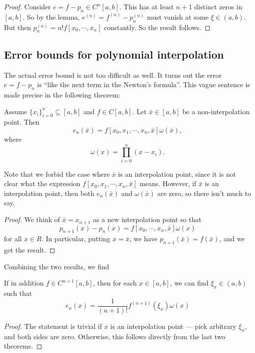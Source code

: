 \documentclass[a4paper]{article}
\begin{document}
\begin{proof}
  Consider $e = f - p_n \in C^n[a, b]$. This has at least $n + 1$ distinct zeros in $[a, b]$. So by the lemma, $e^{(n)} = f^{(n)} - p_n^{(n)}$ must vanish at some $\xi \in (a, b)$. But then $p_n^{(n)} = n! f[x_0, \cdots, x_n]$ constantly. So the result follows.
\end{proof}

\subsection{Error bounds for polynomial interpolation}
The actual error bound is not too difficult as well. It turns out the error $e = f - p_n$ is ``like the next term in the Newton's formula''. This vague sentence is made precise in the following theorem:
\begin{thm}
  Assume $\{x_i\}_{i = 0}^n \subseteq [a, b]$ and $f \in C[a, b]$. Let $\bar{x} \in [a, b]$ be a non-interpolation point. Then
  \[
    e_n(\bar{x}) = f[x_0, x_1, \cdots, x_n, \bar{x}] \omega(\bar{x}),
  \]
  where
  \[
    \omega(x) = \prod_{i = 0}^n (x - x_i).
  \]
\end{thm}
Note that we forbid the case where $\bar{x}$ is an interpolation point, since it is not clear what the expression $f[x_0, x_1, \cdots, x_n, \bar{x}]$ means. However, if $\bar{x}$ is an interpolation point, then both $e_n(\bar x)$ and $\omega(\bar{x})$ are zero, so there isn't much to say.

\begin{proof}
  We think of $\bar{x} = x_{n + 1}$ as a new interpolation point so that
  \[
    p_{n + 1}(x) - p_n(x) = f[x_0, \cdots, x_n, \bar{x}] \omega(x)
  \]
  for all $x \in R$. In particular, putting $x = \bar{x}$, we have $p_{n + 1}(\bar{x}) = f(\bar{x})$, and we get the result.
\end{proof}

Combining the two results, we find
\begin{thm}
  If in addition $f \in C^{n + 1}[a, b]$, then for each $x \in [a, b]$, we can find $\xi_x \in (a, b)$ such that
  \[
    e_n(x) = \frac{1}{(n + 1)!} f^{(n + 1)}(\xi_x) \omega(x)
  \]
\end{thm}

\begin{proof}
  The statement is trivial if $x$ is an interpolation point --- pick arbitrary $\xi_x$, and both sides are zero. Otherwise, this follows directly from the last two theorems.
\end{proof}
\end{document}
